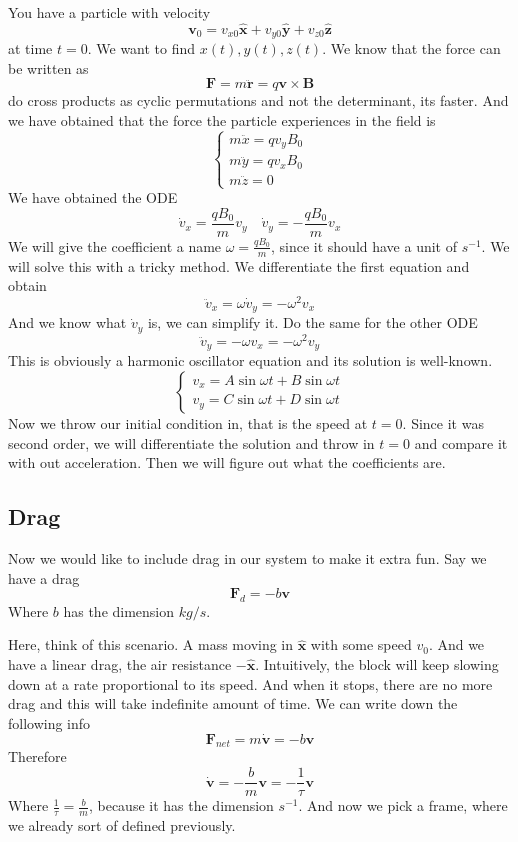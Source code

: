 \documentclass[12pt]{article}
\newcommand{\unx}{\hat{\mathbf{x}}}
\newcommand{\uny}{\hat{\mathbf{y}}}
\newcommand{\unz}{\hat{\mathbf{z}}}
\begin{document}
    You have a particle with velocity 
    \[
    \mathbf{v}_0  = v_{x0}\unx +v_{y0}\uny + v_{z0}\unz 
\] 
at time $t=0$. We want to find $x(t),y(t),z(t)$. We know that the force can be written as
\[
\mathbf{F} = m\ddot{\mathbf{r}} = q\mathbf{v}\times \mathbf{B}
\]
do cross products as cyclic permutations and not the determinant, its faster. And we have obtained that the force the particle experiences in the field is
\[
\begin{cases}
    m\ddot{x} = qv_yB_0\\
    m\ddot{y} = qv_xB_0\\
    m\ddot{z} = 0
\end{cases}
\]
We have obtained the ODE
\[
\dot{v}_x = \frac{qB_0}{m}v_y \quad \dot{v}_y = -\frac{qB_0}{m} v_x
\]
We will give the coefficient a name $\omega = \frac{qB_0}{m}$, since it should have a unit of $s^{-1}$. We will solve this with a tricky method. We differentiate the first equation and obtain
\[
\ddot{v}_x = \omega\dot{v}_y = -\omega^2v_x
\]
And we know what $\dot{v}_y$ is, we can simplify it. Do the same for the other ODE
\[
\ddot{v}_y = -\omega v_x = -\omega^2v_y
\]
This is obviously a harmonic oscillator equation and its solution is well-known. 
\[
\begin{cases}
    v_x = A\sin\omega t + B\sin\omega t\\
    v_y = C\sin\omega t + D\sin\omega t
\end{cases}
\]
Now we throw our initial condition in, that is the speed at $t=0$. Since it was second order, we will differentiate the solution and throw in $t=0$ and compare it with out acceleration. Then we will figure out what the coefficients are. 

\subsection{Drag}
Now we would like to include drag in our system to make it extra fun. Say we have a drag
\[
\mathbf{F}_d = -b\mathbf{v}
\]
Where $b$ has the dimension $kg/s$. 

Here, think of this scenario. A mass moving in $\unx$ with some speed $v_0$. And we have a linear drag, the air resistance $-\unx$. Intuitively, the block will keep slowing down at a rate proportional to its speed. And when it stops, there are no more drag and this will take indefinite amount of time. We can write down the following info
\[
\mathbf{F}_{net} = m\dot{\mathbf{v}} = -b\mathbf{v}
\]
Therefore
\[
\dot{\mathbf{v}} = -\frac{b}{m}\mathbf{v} = -\frac{1}{\tau}\mathbf{v}
\]
Where $\frac{1}{\tau} = \frac{b}{m}$, because it has the dimension $s^{-1}$. And now we pick a frame, where we already sort of defined previously. 
\end{document}
